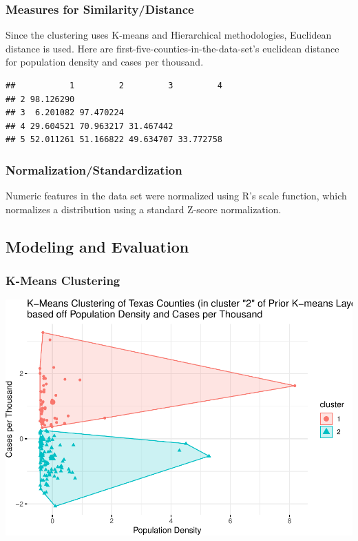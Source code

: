 \documentclass[
]{article}
\begin{document}
\subsubsection{Measures for
Similarity/Distance}\label{measures-for-similaritydistance-1}

Since the clustering uses K-means and Hierarchical methodologies,
Euclidean distance is used. Here are
first-five-counties-in-the-data-set's euclidean distance for population
density and cases per thousand.

\begin{verbatim}
##           1         2         3         4
## 2 98.126290                              
## 3  6.201082 97.470224                    
## 4 29.604521 70.963217 31.467442          
## 5 52.011261 51.166822 49.634707 33.772758
\end{verbatim}

\subsubsection{Normalization/Standardization}\label{normalizationstandardization-1}

Numeric features in the data set were normalized using R's scale
function, which normalizes a distribution using a standard Z-score
normalization.

\subsection{Modeling and Evaluation}\label{modeling-and-evaluation-1}

\subsubsection{K-Means Clustering}\label{k-means-clustering-1}

\includegraphics{Final-Report_files/figure-latex/unnamed-chunk-8-1.pdf}
\end{document}
